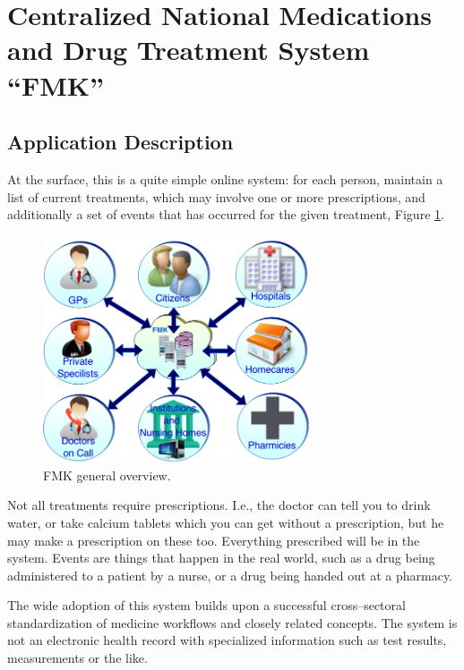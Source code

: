 \documentclass[11pt,a4paper]{report}
\begin{document}
\section{Centralized National Medications and Drug Treatment System ``FMK''}
\subsection{Application Description}
At the surface, this is a quite simple online system: for each person, maintain a list of current treatments, which may involve one or more prescriptions, and additionally a set of events that has occurred for the given treatment, Figure \ref{fig:medicalcard}. 
\begin{figure}[!h]
	\centering
	\includegraphics[width=0.7\textwidth]{./img/medicalcard.png}

	\caption{FMK general overview.}
	\label{fig:medicalcard}
\end{figure}

Not all treatments require prescriptions. I.e., the doctor can tell you to drink water, or take calcium tablets which you can get without a prescription, but he may make a prescription on these too. Everything prescribed will be in the system. Events are things that happen in the real world, such as a drug being administered to a patient by a nurse, or a drug being handed out at a pharmacy. 

The wide adoption of this system builds upon a successful cross--sectoral standardization of medicine workflows and closely related concepts. The system is not an electronic health record with specialized information such as test results, measurements or the like.
\end{document}
